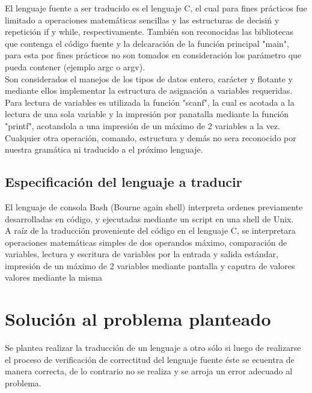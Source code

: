 \documentclass[aspectratio=169]{article}
\begin{document}
	El lenguaje fuente a ser traducido es el lenguaje C, el cual para fines pr\'acticos fue limitado a 
	operaciones matemáticas sencillas y las estructuras de decisi\'n y repetici\'on if y while, respectivamente.
	Tambi\'en son reconocidas las bibliotecas que contenga el c\'odigo fuente y la delcaraci\'on de la funci\'on
	principal "main", para esta por fines pr\'acticos no son tomados en consideraci\'on los par\'ametro
	que pueda contener (ejemplo argc o argv). \\

	Son considerados el manejos de los tipos de datos entero, carácter y flotante y mediante ellos
	implementar la estructura de asignaci\'on a variables requeridas.\\

	Para lectura de variables es utilizada la funci\'on "scanf", la cual es acotada a la lectura
	de una sola variable y la impresi\'on por panatalla mediante la funci\'on "printf", acotandola a
	una impresi\'on de un m\'aximo de 2 variables a la vez. \\

	Cualquier otra operaci\'on, comando, estructura y demás no sera reconocido por nuestra gramática 
	ni traducido a el pr\'oximo lenguaje.

\subsection{Especificaci\'on del lenguaje a traducir}

	El lenguaje de consola Bash (Bourne again shell) interpreta ordenes previamente desarrolladas en c\'odigo, y
	ejecutadas mediante un script en una shell de Unix.\\

	A ra\'iz de la traducci\'on proveniente del c\'odigo en el lenguaje C, se interpretara operaciones 
	matemáticas simples de dos operandos m\'aximo, comparación de variables, lectura y escritura de variables
	por la entrada y salida estándar, impresi\'on de un m\'aximo de 2 variables mediante pantalla 
	y caputra de valores valores mediante la misma

\section{Soluci\'on al problema planteado}

	Se plantea realizar la traducción de un lenguaje a otro s\'olo si luego de realizarse el proceso de 
	verificaci\'on de correctitud del lenguaje fuente \'este se ecuentra de manera correcta, de 
	lo contrario no se realiza y se arroja un error adecuado al problema.\\
\end{document}
